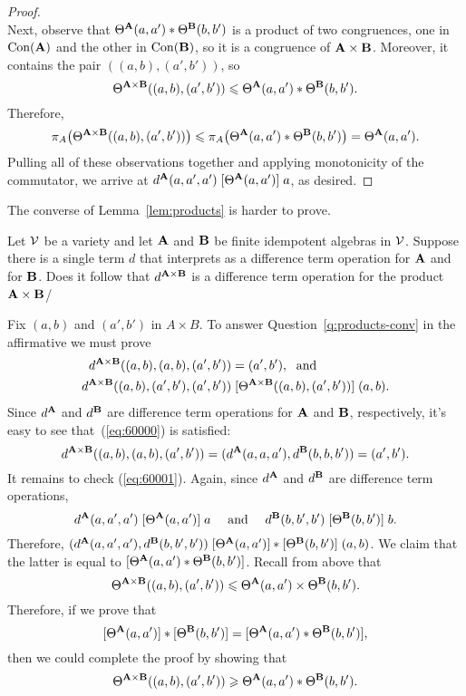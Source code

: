 \begin{proof}
\[  \]
  Next, observe that
  $\Theta^{\mathbf{A}}(a,a') \ast \Theta^{\mathbf{B}}(b,b')$  %
  is a product of two congruences, one in $\operatorname{Con}(\mathbf{A})$ and the
  other in $\operatorname{Con}(\mathbf{B})$, so it is a congruence of $\mathbf{A}\times \mathbf{B}$.
  Moreover, it contains the pair $((a,b), (a',b'))$, so
  \[
  \Theta^{\mathbf{A} \times \mathbf{B}}((a, b), (a', b'))\leqslant \Theta^{\mathbf{A}}(a,a') \ast \Theta^{\mathbf{B}}(b,b').
  \]
  Therefore,
  \[
  \pi_A\bigl(\Theta^{\mathbf{A} \times \mathbf{B}}((a, b), (a', b'))\bigr)
  \leqslant
  \pi_A\bigl(\Theta^{\mathbf{A}}(a,a') \ast \Theta^{\mathbf{B}}(b,b')\bigr) =
  \Theta^{\mathbf{A}}(a,a').
  \]
  Pulling all of these observations together and applying monotonicity of the
  commutator, we arrive at $d^{\mathbf{A}}(a, a',a')  \mathrel{[\Theta^{\mathbf{A}}(a,a')]} a$, as desired.
\end{proof}

The converse of Lemma~\ref{lem:products} is harder to prove.
\begin{question}
  \label{q:products-conv}
 Let $\mathcal{V}$ be a variety and let $\mathbf{A}$ and $\mathbf{B}$ be finite idempotent
 algebras in $\mathcal{V}$. Suppose there is a single term $d$ that
 interprets as a difference term operation for $\mathbf{A}$ and for $\mathbf{B}$.
 Does it follow that $d^{\mathbf{A} \times \mathbf{B}}$ is a difference term operation for the product
 $\mathbf{A} \times \mathbf{B}$/
\end{question}

Fix $(a, b)$ and $(a', b')$ in $A \times B$.
To answer Question~\ref{q:products-conv} in the affirmative we must prove
\begin{align}
  d^{\mathbf{A} \times \mathbf{B}}((a, b), (a, b), (a', b')) &= (a', b'),\; \text{ and } \label{eq:60000}\\
    d^{\mathbf{A} \times \mathbf{B}}((a, b), (a', b'), (a', b'))
    &\mathrel{[\Theta^{\mathbf{A} \times \mathbf{B}}((a, b), (a', b'))]} (a, b). \label{eq:60001}
  \end{align}
  Since $d^{\mathbf{A}}$ and $d^{\mathbf{B}}$ are difference term operations for $\mathbf{A}$ and
  $\mathbf{B}$, respectively, it's easy to see that~(\ref{eq:60000}) is satisfied:
  \[
  d^{\mathbf{A} \times \mathbf{B}}((a, b), (a, b), (a', b')) =
  (d^{\mathbf{A}}(a, a, a'),  d^{\mathbf{B}}(b, b, b')) = (a', b').
  \]
  It remains to check (\ref{eq:60001}).
  Again, since $d^{\mathbf{A}}$ and
  $d^{\mathbf{B}}$ are difference term operations,
  \[
  d^{\mathbf{A}}(a,a',a')
  \mathrel{[\Theta^{\mathbf{A}}(a,a')]} a \quad \text{ and } \quad
  d^{\mathbf{B}}(b, b', b')
  \mathrel{[\Theta^{\mathbf{B}}(b,b')]} b.
  \]
  Therefore,
  $(d^{\mathbf{A}}(a,a',a'),d^{\mathbf{B}}(b, b', b'))
    \mathrel{[\Theta^{\mathbf{A}}(a,a')]\ast[\Theta^{\mathbf{B}}(b,b')]}
    (a,b)$.
  We claim that the latter is equal to
  $[\Theta^{\mathbf{A}}(a,a') \ast \Theta^{\mathbf{B}}(b,b')]$.
  Recall from above that
  \[
  \Theta^{\mathbf{A} \times \mathbf{B}}((a, b), (a', b'))\leqslant \Theta^{\mathbf{A}}(a,a') \times \Theta^{\mathbf{B}}(b,b').
  \]
  Therefore, if we prove that
  \[
  [\Theta^{\mathbf{A}}(a,a')]  \ast  [\Theta^{\mathbf{B}}(b,b')] =
  [\Theta^{\mathbf{A}}(a,a') \ast \Theta^{\mathbf{B}}(b,b')],
  \]
  then we could complete the proof by showing that
  \begin{equation}
    \label{eq:655}
  \Theta^{\mathbf{A} \times \mathbf{B}}((a, b), (a', b'))\geqslant \Theta^{\mathbf{A}}(a,a') \ast \Theta^{\mathbf{B}}(b,b').
  \end{equation}

